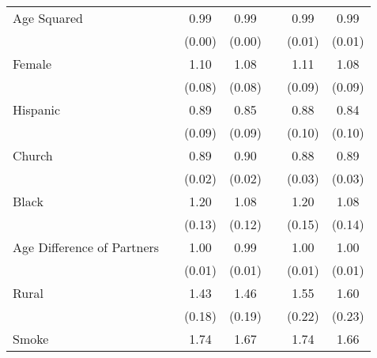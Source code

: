 {\begin{tabular}{l*{6}{c}}
Age Squared     &                  &     0.99\sym{*}  &     0.99\sym{*}  &                  &     0.99\sym{**} &     0.99\sym{*}  \\
                &                  &   (0.00)         &   (0.00)         &                  &   (0.01)         &   (0.01)         \\
Female          &                  &     1.10         &     1.08         &                  &     1.11         &     1.08         \\
                &                  &   (0.08)         &   (0.08)         &                  &   (0.09)         &   (0.09)         \\
Hispanic        &                  &     0.89         &     0.85         &                  &     0.88         &     0.84         \\
                &                  &   (0.09)         &   (0.09)         &                  &   (0.10)         &   (0.10)         \\
Church          &                  &     0.89\sym{***}&     0.90\sym{***}&                  &     0.88\sym{***}&     0.89\sym{***}\\
                &                  &   (0.02)         &   (0.02)         &                  &   (0.03)         &   (0.03)         \\
Black           &                  &     1.20         &     1.08         &                  &     1.20         &     1.08         \\
                &                  &   (0.13)         &   (0.12)         &                  &   (0.15)         &   (0.14)         \\
Age Difference of Partners&                  &     1.00         &     0.99         &                  &     1.00         &     1.00         \\
                &                  &   (0.01)         &   (0.01)         &                  &   (0.01)         &   (0.01)         \\
Rural           &                  &     1.43\sym{***}&     1.46\sym{***}&                  &     1.55\sym{***}&     1.60\sym{***}\\
                &                  &   (0.18)         &   (0.19)         &                  &   (0.22)         &   (0.23)         \\
Smoke           &                  &     1.74\sym{***}&     1.67\sym{***}&                  &     1.74\sym{***}&     1.66\sym{***}\\

\end{tabular}}
